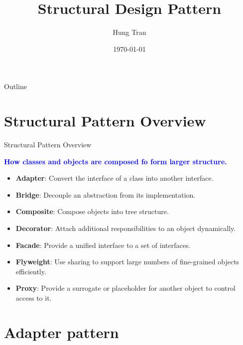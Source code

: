 \documentclass[13pt]{beamer}
\title[Design Pattern]{Structural Design Pattern}
\author{Hung Tran}
\institute{Fpt software}
\date{\today}
\begin{document}
\begin{frame}
\titlepage
\end{frame}

\begin{frame}{Outline}
\tableofcontents
\end{frame}

\section{Structural Pattern Overview}

\begin{frame}{Structural Pattern Overview}
	\begin{center}
	\textcolor{blue}{\textbf{How classes and objects are composed fo form larger structure.}}
	\end{center}
	\begin{itemize}
		\item \textbf{Adapter}: Convert the interface of a class into another interface.
		\item \textbf{Bridge}: Decouple an abstraction from its implementation.
		\item \textbf{Composite}: Compose objects into tree structure.
		\item \textbf{Decorator}: Attach additional responsibilities to an object dynamically.
		\item \textbf{Facade}: Provide a unified interface to a set of interfaces.
		\item \textbf{Flyweight}: Use sharing to support large numbers of fine-grained objects efficiently.
		\item \textbf{Proxy}: Provide a surrogate or placeholder for another object to control access to it.
	\end{itemize}
\end{frame}

\section{Adapter pattern}
\end{document}
